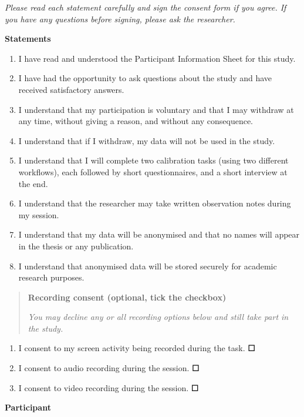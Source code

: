 \documentclass[
]{article}
\begin{document}
\emph{Please read each statement carefully and sign the consent form if you agree. If you have any questions before signing, please ask the researcher.}

\textbf{Statements}

\begin{enumerate}
\def\labelenumi{\arabic{enumi}.}
\item
  I have read and understood the Participant Information Sheet for this study.
\item
  I have had the opportunity to ask questions about the study and have received satisfactory answers.
\item
  I understand that my participation is voluntary and that I may withdraw at any time, without giving a reason, and without any consequence.
\item
  I understand that if I withdraw, my data will not be used in the study.
\item
  I understand that I will complete two calibration tasks (using two different workflows), each followed by short questionnaires, and a short interview at the end.
\item
  I understand that the researcher may take written observation notes during my session.
\item
  I understand that my data will be anonymised and that no names will appear in the thesis or any publication.
\item
  I understand that anonymised data will be stored securely for academic research purposes.
\end{enumerate}

\begin{quote}
\textbf{Recording consent (optional, tick the checkbox)}

\emph{You may decline any or all recording options below and still take part in the study.}
\end{quote}

\begin{enumerate}
\def\labelenumi{\arabic{enumi}.}
\setcounter{enumi}{8}
\item
  I consent to my screen activity being recorded during the task. \textbf{☐}
\item
  I consent to audio recording during the session. \textbf{☐}
\item
  I consent to video recording during the session. \textbf{☐}
\end{enumerate}

\textbf{Participant}
\end{document}
